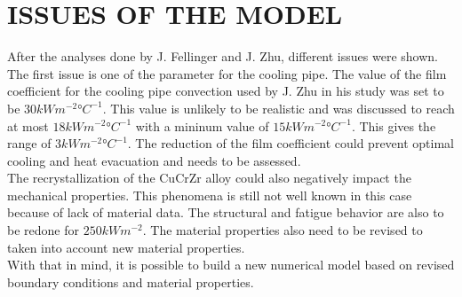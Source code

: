 \section{ISSUES OF THE MODEL}
\normalsize{After the analyses done by J. Fellinger and J. Zhu, different issues were shown. The first issue is one of the parameter for the cooling pipe. The value of the film coefficient for the cooling pipe convection used by J. Zhu in his study \cite{zhu_parametric_2019} was set to be $30 \unit{kWm^{-2}\si{\degree}C^{-1}}$. This value is unlikely to be realistic and was discussed to reach at most $18 \unit{kWm^{-2}\si{\degree}C^{-1}}$ with a mininum value of $15 \unit{kWm^{-2}\si{\degree}C^{-1}}$. This gives the range of $3 \unit{kWm^{-2}\si{\degree}C^{-1}}$. The reduction of the film coefficient could prevent optimal cooling and heat evacuation and needs to be assessed.}
\\
\break
\normalsize{\indent The recrystallization of the \acrshort{CuCrZr} alloy could also negatively impact the mechanical properties. This phenomena is still not well known in this case because of lack of material data. The structural and fatigue behavior are also to be redone for $250 \unit{kWm^{-2}}$. The material properties also need to be revised to taken into account new material properties.}
\\
\break
\normalsize{\indent With that in mind, it is possible to build a new numerical model based on revised boundary conditions and material properties.}